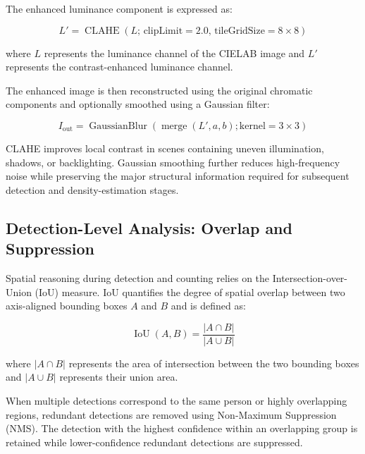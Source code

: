 \documentclass[12pt,a4paper]{report}
\begin{document}
The enhanced luminance component is expressed as:

\begin{equation}
L' = \operatorname{CLAHE}
\left(
L;\,\text{clipLimit}=2.0,\,
\text{tileGridSize}=8\times8
\right)
\label{eq:clahe}
\end{equation}

where $L$ represents the luminance channel of the CIELAB image and $L'$
represents the contrast-enhanced luminance channel.

The enhanced image is then reconstructed using the original chromatic
components and optionally smoothed using a Gaussian filter:

\begin{equation}
I_{\mathrm{out}} =
\operatorname{GaussianBlur}
\left(
\operatorname{merge}(L',a,b);
\text{kernel}=3\times3
\right)
\label{eq:gaussian}
\end{equation}

CLAHE improves local contrast in scenes containing uneven illumination,
shadows, or backlighting. Gaussian smoothing further reduces high-frequency
noise while preserving the major structural information required for
subsequent detection and density-estimation stages.


\subsection{Detection-Level Analysis: Overlap and Suppression}
\label{sec:nms}

Spatial reasoning during detection and counting relies on the
Intersection-over-Union (IoU) measure. IoU quantifies the degree of spatial
overlap between two axis-aligned bounding boxes $A$ and $B$ and is defined as:

\begin{equation}
\operatorname{IoU}(A,B)
=
\frac{|A\cap B|}
{|A\cup B|}
\label{eq:iou}
\end{equation}

where $|A\cap B|$ represents the area of intersection between the two
bounding boxes and $|A\cup B|$ represents their union area.

When multiple detections correspond to the same person or highly overlapping
regions, redundant detections are removed using Non-Maximum Suppression
(NMS). The detection with the highest confidence within an overlapping group
is retained while lower-confidence redundant detections are suppressed.
\end{document}

